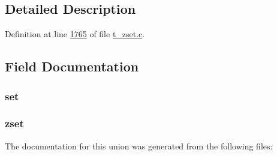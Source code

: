 \subsection{Detailed Description}


Definition at line \hyperlink{t__zset_8c_source_l01765}{1765} of file \hyperlink{t__zset_8c_source}{t\+\_\+zset.\+c}.



\subsection{Field Documentation}
\mbox{\label{unionzsetopsrc_8iter_acdaeeeba9b4a4c5ebf042c0215a7bb0e}} 
\subsubsection{\texorpdfstring{set}{set}}
{\footnotesize\ttfamily }

\mbox{\label{unionzsetopsrc_8iter_a282529b9d439a0ee03b9e7358e3b9ab8}} 
\subsubsection{\texorpdfstring{zset}{zset}}
{\footnotesize\ttfamily }



The documentation for this union was generated from the following files\+: